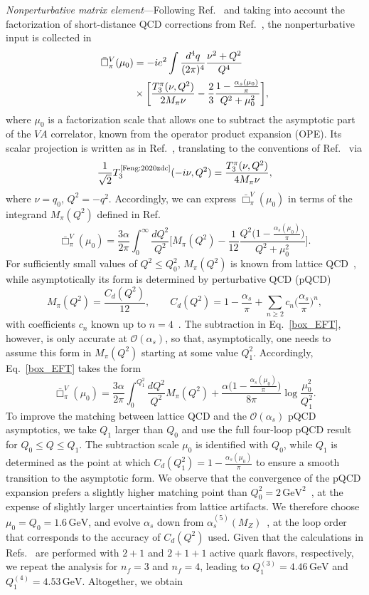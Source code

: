 \documentclass[prl,twocolumn,twoside,preprintnumbers,superscriptaddress,nofootinbib,letterpaper]{revtex4-1}
\newcommand{\GeV}{\,\text{GeV}}
\newcommand{\mpi}{M_\pi}
\newcommand{\Order}{\mathcal{O}}
\newcommand{\beq}{\begin{equation}}
\newcommand{\eeq}{\end{equation}}
\begin{document}
\emph{Nonperturbative matrix element}---Following Ref.~\cite{Cirigliano:2023fnz}
and taking into account the factorization of short-distance
QCD corrections from Ref.~\cite{Gorbahn:2025ssv},
the nonperturbative input is collected in
\begin{align}
 \bar\Box^V_\pi(\mu_0)
 &=-ie^2\int\frac{d^4q}{(2\pi)^4}\frac{\nu^2+Q^2}{Q^4}\notag\\
 &\times\bigg[\frac{T_3^\pi(\nu,Q^2)}{2M_\pi\nu}-\frac{2}{3}\frac{1-\frac{\alpha_s(\mu_0)}{\pi}}{Q^2+\mu_0^2}\bigg],
\label{eq:box1}
\end{align}
where  $\mu_0$ is a factorization scale that allows one to subtract the asymptotic part of the $VA$ correlator, known from the operator product expansion (OPE).
Its scalar projection is written as in Ref.~\cite{Cirigliano:2023fnz}, translating to the conventions of Ref.~\cite{Feng:2020zdc} via
\beq
\label{T3_iden}
\frac{1}{\sqrt{2}}T_3^\text{\cite{Feng:2020zdc}}(-i\nu,Q^2)=\frac{T_3^\pi(\nu,Q^2)}{4\mpi\nu},
\eeq
where $\nu=q_0$, $Q^2=-q^2$. Accordingly, we can express $\bar\Box^V_\pi(\mu_0)$ in terms of the integrand $M_\pi(Q^2)$ defined in Ref.~\cite{Feng:2020zdc}
\beq
\label{box_EFT}
\bar\Box^V_\pi(\mu_0)
=\frac{3\alpha}{2\pi}\int_0^\infty \frac{dQ^2}{Q^2}\bigg[M_\pi(Q^2)-\frac{1}{12}\frac{Q^2\big(1-\frac{\alpha_s(\mu_0)}{\pi}\big)}{Q^2+\mu_0^2}\bigg].
\eeq
For sufficiently small values of $Q^2\leq Q_0^2$, $M_\pi(Q^2)$ is known from lattice QCD~\cite{Feng:2020zdc,Yoo:2023gln}, while asymptotically its form is determined by perturbative QCD (pQCD)
\beq
\label{pQCD}
M_\pi(Q^2)=\frac{C_d(Q^2)}{12}, \qquad
C_d(Q^2)=1-\frac{\alpha_s}{\pi}+\sum_{n\geq 2} c_n\Big(\frac{\alpha_s}{\pi}\Big)^n,
\eeq
with coefficients $c_{n}$ known up to $n=4$~\cite{Larin:1991tj,Baikov:2010je}. The subtraction in Eq.~\eqref{box_EFT}, however, is only accurate at $\Order(\alpha_s)$, so that, asymptotically, one needs to assume this form in $M_\pi(Q^2)$ starting at some value $Q_1^2$. Accordingly, Eq.~\eqref{box_EFT} takes the form
\beq
\bar\Box^V_\pi(\mu_0)=\frac{3\alpha}{2\pi}\int_0^{Q_1^2} \frac{dQ^2}{Q^2}M_\pi(Q^2)+\frac{\alpha\big(1-\frac{\alpha_s(\mu_0)}{\pi}\big)}{8\pi}\log\frac{\mu_0^2}{Q_1^2}.
\eeq
To improve the matching between lattice QCD and the $\Order(\alpha_s)$ pQCD asymptotics, we take $Q_1$ larger than $Q_0$ and use the full four-loop pQCD result for $Q_0\leq Q\leq Q_1$. The subtraction scale $\mu_0$ is identified with $Q_0$, while $Q_1$ is determined as the point at which $C_d(Q_1^2)=1-\frac{\alpha_s(\mu_0)}{\pi}$ to ensure a smooth transition to the asymptotic form. We observe that the convergence of the pQCD expansion prefers a slightly higher matching point than $Q_0^2=2\GeV^2$~\cite{Feng:2020zdc}, at the expense of slightly larger uncertainties from lattice artifacts. We therefore choose $\mu_0=Q_0=1.6\GeV$, and evolve $\alpha_s$ down from $\alpha_s^{(5)}(M_Z)$~\cite{Chetyrkin:2000yt,Herren:2017osy}, at the loop order that corresponds to the accuracy of $C_d(Q^2)$ used. Given that the calculations in Refs.~\cite{Feng:2020zdc,Yoo:2023gln} are performed with $2+1$ and $2+1+1$ active quark flavors, respectively, we repeat the analysis for $n_f=3$ and $n_f=4$, leading to $Q_1^{(3)}=4.46\GeV$ and $Q_1^{(4)}=4.53\GeV$. Altogether, we obtain
\end{document}
